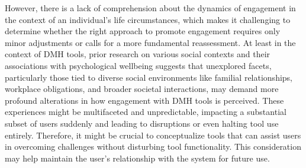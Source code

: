 However, there is a lack of comprehension about the dynamics of engagement in the context of an individual's life circumstances, which makes it challenging to determine whether the right approach to promote engagement requires only minor adjustments or calls for a more fundamental reassessment. At least in the context of DMH tools, prior research on various social contexts and their associations with psychological wellbeing  \cite{bhattacharjee2023investigating, alegria2018social, allen2014social, bhattacharjee2021understanding, lewis2019cultural, slavich2023social, tachtler2021unaccompanied, lattie2020designing, bhattacharjee2023integrating, slavich2020social} suggests that unexplored facets, particularly those tied to diverse social environments like familial relationships, workplace obligations, and broader societal interactions, may demand more profound alterations in how engagement with DMH tools is perceived. These experiences might be multifaceted and unpredictable, impacting a substantial subset of users suddenly and leading to disruptions or even halting tool use entirely. Therefore, it might be crucial to conceptualize tools that can assist users in overcoming challenges without disturbing tool functionality. This consideration may help maintain the user's relationship with the system for future use. %
















